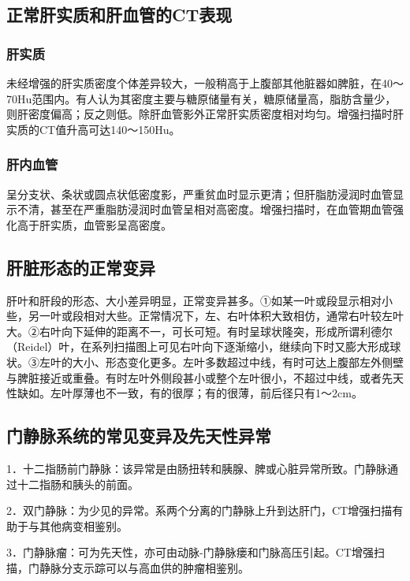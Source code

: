 \subsection{正常肝实质和肝血管的CT表现}

\subsubsection{肝实质}

未经增强的肝实质密度个体差异较大，一般稍高于上腹部其他脏器如脾脏，在40～70Hu范围内。有人认为其密度主要与糖原储量有关，糖原储量高，脂肪含量少，则肝密度偏高；反之则低。除肝血管影外正常肝实质密度相对均匀。增强扫描时肝实质的CT值升高可达140～150Hu。

\subsubsection{肝内血管}

呈分支状、条状或圆点状低密度影，严重贫血时显示更清；但肝脂肪浸润时血管显示不清，甚至在严重脂肪浸润时血管呈相对高密度。增强扫描时，在血管期血管强化高于肝实质，血管影呈高密度。

\subsection{肝脏形态的正常变异}

肝叶和肝段的形态、大小差异明显，正常变异甚多。①如某一叶或段显示相对小些，另一叶或段相对大些。正常情况下，左、右叶体积大致相仿，通常右叶较左叶大。②右叶向下延伸的距离不一，可长可短。有时呈球状隆突，形成所谓利德尔（Reidel）叶，在系列扫描图上可见右叶向下逐渐缩小，继续向下时又膨大形成球状。③左叶的大小、形态变化更多。左叶多数超过中线，有时可达上腹部左外侧壁与脾脏接近或重叠。有时左叶外侧段甚小或整个左叶很小，不超过中线，或者先天性缺如。左叶厚薄也不一致，有的很厚；有的很薄，前后径只有1～2cm。

\subsection{门静脉系统的常见变异及先天性异常}

1．十二指肠前门静脉：该异常是由肠扭转和胰腺、脾或心脏异常所致。门静脉通过十二指肠和胰头的前面。

2．双门静脉：为少见的异常。系两个分离的门静脉上升到达肝门，CT增强扫描有助于与其他病变相鉴别。

3．门静脉瘤：可为先天性，亦可由动脉-门静脉瘘和门脉高压引起。CT增强扫描，门静脉分支示踪可以与高血供的肿瘤相鉴别。

